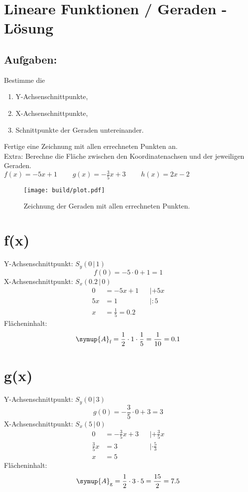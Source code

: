 


\section*{Lineare Funktionen / Geraden - Lösung}
\subsection*{Aufgaben:}
Bestimme die
\begin{enumerate}
      \item Y-Achsenschnittpunkte,
      \item X-Achsenschnittpunkte,
      \item Schnittpunkte der Geraden untereinander.
\end{enumerate}
Fertige eine Zeichnung mit allen errechneten Punkten an.\\
Extra: Berechne die Fläche zwischen den Koordinatenachsen und der jeweiligen Geraden.
\\
$f(x) = -5x + 1 \;\;\;\;\;\;\;\;
g(x) = -\frac{3}{5}x + 3 \;\;\;\;\;\;\;\;
h(x) = 2x - 2$

\begin{figure}
      \centering
      \texttt{[image: build/plot.pdf]}
      \caption{Zeichnung der Geraden mit allen errechneten Punkten.}
\end{figure}

\newpage
\section*{f(x)}
Y-Achsenschnittpunkt: $S_y (0\,|\,1)$
\begin{equation}
      f(0) = -5\cdot0 + 1 = 1
\end{equation}
X-Achsenschnittpunkt: $S_x (0.2\,|\,0)$
\begin{align}
      0 &= -5x + 1 && | + 5x \\
      5x &= 1 && | : 5 \\
      x &= \frac{1}{5} = 0.2
\end{align}
Flächeninhalt:
\begin{equation}
      \symup{A}_\text{f} = \frac{1}{2} \cdot 1 \cdot \frac{1}{5}
            = \frac{1}{10} = 0.1
\end{equation}

\section*{g(x)}
Y-Achsenschnittpunkt: $S_y (0\,|\,3)$
\begin{equation}
      g(0) = -\frac{3}{5}\cdot0 + 3 = 3
\end{equation}
X-Achsenschnittpunkt: $S_x (5\,|\,0)$
\begin{align}
    0 &= -\frac{3}{5}x + 3 && | + \frac{3}{5}x \\
      \frac{3}{5}x &= 3 && | \cdot \frac{5}{3} \\
      x &= 5
\end{align}
Flächeninhalt:
\begin{equation}
      \symup{A}_\text{g} = \frac{1}{2} \cdot 3 \cdot 5
            = \frac{15}{2} = 7.5
\end{equation}


